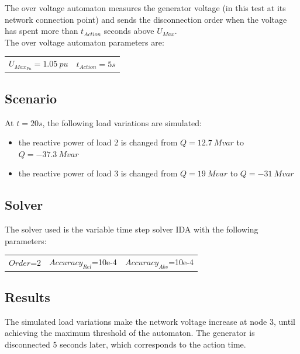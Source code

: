 \documentclass[a4paper, 12pt]{report}
\begin{document}
The over voltage automaton measures the generator voltage (in this test at its network connection point) and sends the disconnection order when the voltage has spent more than $t_{Action}$ seconds above $U_{Max}$.\\

The over voltage automaton parameters are:
\begin{center}
\begin{tabular}{l|l}
   $U_{Max_{Pu}}= 1.05\ pu$ & $t_{Action}=5s$  \\
\end{tabular}
\end{center}

\subsection{Scenario}
At $t=20s$, the following load variations are simulated:
\begin{itemize}
\item{the reactive power of load 2 is changed from $Q=12.7\ Mvar$ to $Q=-37.3\ Mvar$}
\item{the reactive power of load 3 is changed from $Q=19\ Mvar$ to $Q=-31\ Mvar$}
\end{itemize}

\subsection{Solver}
The solver used is the variable time step solver IDA with the following parameters:
\begin{center}
\begin{tabular}{l|l|l}
   $Order$=2 & $Accuracy_{Rel}$=10e-4 & $Accuracy_{Abs}$=10e-4 \\
\end{tabular}
\end{center}

\newpage
\subsection{Results}

The simulated load variations make the network voltage increase at node 3, until achieving the maximum threshold of the automaton. The generator is disconnected 5 seconds later, which corresponds to the action time.\\
\end{document}
